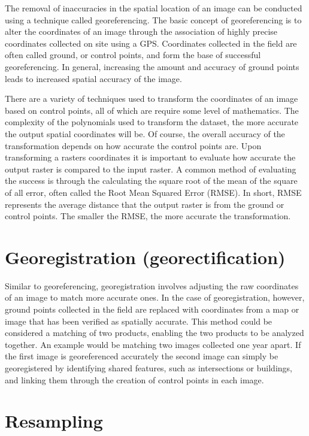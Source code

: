 \documentclass[
]{book}
\begin{document}
The removal of inaccuracies in the spatial location of an image can be
conducted using a technique called georeferencing. The basic concept of
georeferencing is to alter the coordinates of an image through the
association of highly precise coordinates collected on site using a GPS.
Coordinates collected in the field are often called ground, or control
points, and form the base of successful georeferencing. In general,
increasing the amount and accuracy of ground points leads to increased
spatial accuracy of the image.

There are a variety of techniques used to transform the coordinates of
an image based on control points, all of which are require some level of
mathematics. The complexity of the polynomials used to transform the
dataset, the more accurate the output spatial coordinates will be. Of
course, the overall accuracy of the transformation depends on how
accurate the control points are. Upon transforming a rasters coordinates
it is important to evaluate how accurate the output raster is compared
to the input raster. A common method of evaluating the success is
through the calculating the square root of the mean of the square of all
error, often called the Root Mean Squared Error (RMSE). In short, RMSE
represents the average distance that the output raster is from the
ground or control points. The smaller the RMSE, the more accurate the
transformation.

\hypertarget{georegistration-georectification}{%
\section{Georegistration (georectification)}\label{georegistration-georectification}}

Similar to georeferencing, georegistration involves adjusting the raw
coordinates of an image to match more accurate ones. In the case of
georegistration, however, ground points collected in the field are
replaced with coordinates from a map or image that has been verified as
spatially accurate. This method could be considered a matching of two
products, enabling the two products to be analyzed together. An example
would be matching two images collected one year apart. If the first
image is georeferenced accurately the second image can simply be
georegistered by identifying shared features, such as intersections or
buildings, and linking them through the creation of control points in
each image.

\hypertarget{resampling}{%
\section{Resampling}\label{resampling}}
\end{document}
